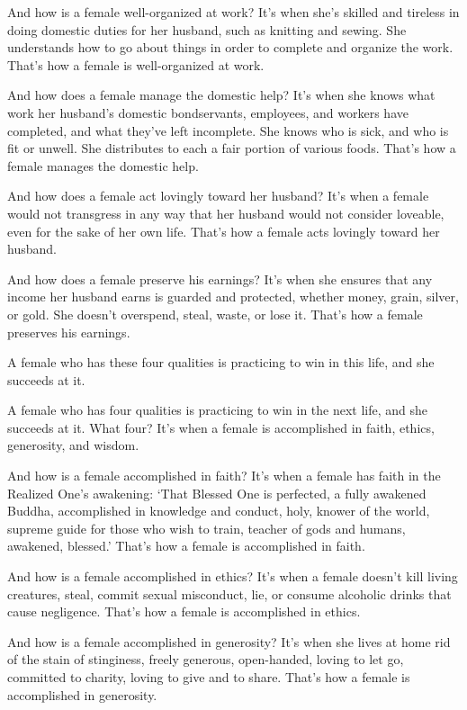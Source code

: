 \documentclass[12pt,openany]{book}%
\begin{document}
And how is a female well-organized at work? It’s when she’s skilled and tireless in doing domestic duties for her husband, such as knitting and sewing. She understands how to go about things in order to complete and organize the work. That’s how a female is well-organized at work. 

And how does a female manage the domestic help? It’s when she knows what work her husband’s domestic bondservants, employees, and workers have completed, and what they’ve left incomplete. She knows who is sick, and who is fit or unwell. She distributes to each a fair portion of various foods. That’s how a female manages the domestic help. 

And how does a female act lovingly toward her husband? It’s when a female would not transgress in any way that her husband would not consider loveable, even for the sake of her own life. That’s how a female acts lovingly toward her husband. 

And how does a female preserve his earnings? It’s when she ensures that any income her husband earns is guarded and protected, whether money, grain, silver, or gold. She doesn’t overspend, steal, waste, or lose it. That’s how a female preserves his earnings. 

A female who has these four qualities is practicing to win in this life, and she succeeds at it. 

A female who has four qualities is practicing to win in the next life, and she succeeds at it. What four? It’s when a female is accomplished in faith, ethics, generosity, and wisdom. 

And how is a female accomplished in faith? It’s when a female has faith in the Realized One’s awakening: ‘That Blessed One is perfected, a fully awakened Buddha, accomplished in knowledge and conduct, holy, knower of the world, supreme guide for those who wish to train, teacher of gods and humans, awakened, blessed.’ That’s how a female is accomplished in faith. 

And how is a female accomplished in ethics? It’s when a female doesn’t kill living creatures, steal, commit sexual misconduct, lie, or consume alcoholic drinks that cause negligence. That’s how a female is accomplished in ethics. 

And how is a female accomplished in generosity? It’s when she lives at home rid of the stain of stinginess, freely generous, open-handed, loving to let go, committed to charity, loving to give and to share. That’s how a female is accomplished in generosity. 
\end{document}
